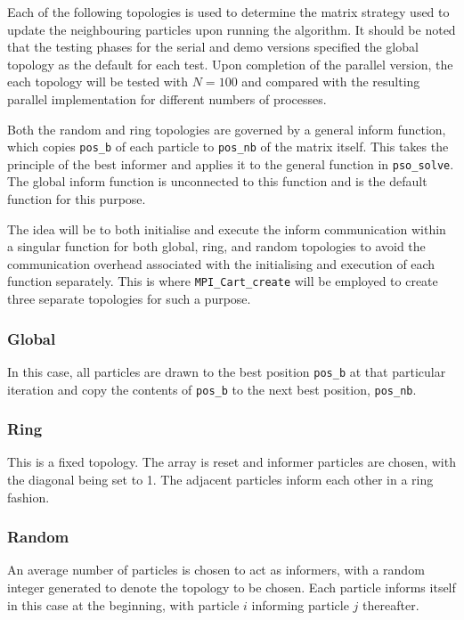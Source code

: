 \documentclass[KomodoMain.tex]{subfiles}
\begin{document}
Each of the following topologies is used to determine the matrix strategy used to update the neighbouring particles upon running the algorithm. It should be noted that the testing phases for the serial and demo versions specified the global topology as the default for each test. Upon completion of the parallel version, the each topology will be tested with $N = 100$ and compared with the resulting parallel implementation for different numbers of processes. 
\par
Both the random and ring topologies are governed by a general inform function, which copies \texttt{pos\_b} of each particle to \texttt{pos\_nb} of the matrix itself. This takes the principle of the best informer and applies it to the general function in \texttt{pso\_solve}. The global inform function is unconnected to this function and is the default function for this purpose.
\par
The idea will be to both initialise and execute the inform communication within a singular function for both global, ring, and random topologies to avoid the communication overhead associated with the initialising and execution of each function separately. This is where \texttt{MPI\_Cart\_create} will be employed to create three separate topologies for such a purpose.

\subsubsection{Global}

In this case, all particles are drawn to the best position \texttt{pos\_b} at that particular iteration and copy the contents of \texttt{pos\_b} to the next best position, \texttt{pos\_nb}. 

\subsubsection{Ring}

This is a fixed topology. The array is reset and informer particles are chosen, with the diagonal being set to 1. The adjacent particles inform each other in a ring fashion.

\subsubsection{Random}

An average number of particles is chosen to act as informers, with a random integer generated to denote the topology to be chosen. Each particle informs itself in this case at the beginning, with particle $i$ informing particle $j$ thereafter.
\end{document}
